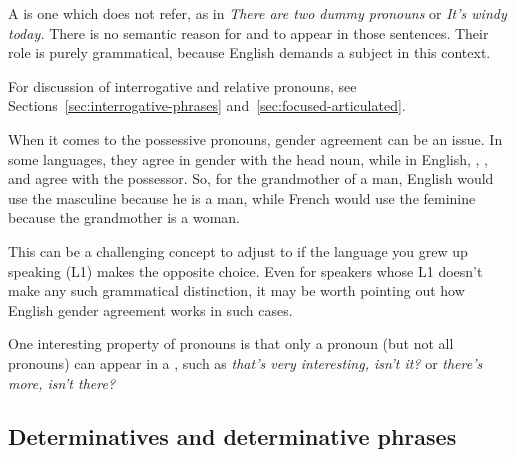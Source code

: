 A  is one which does not refer, as in \textit{\emph{There} are two dummy pronouns} or \textit{\emph{It}'s windy today.}\label{sec:dummy} There is no semantic reason for  and  to appear in those sentences. Their role is purely grammatical, because English demands a subject in this context.

For discussion of interrogative and relative pronouns, see Sections~\ref{sec:interrogative-phrases} and~\ref{sec:focused-articulated}.

When it comes to the possessive pronouns, gender agreement can be an issue. In some languages, they agree in gender with the head noun, while in English, , , and  agree with the possessor. So, for the grandmother of a man, English would use the masculine  because he is a man, while French would use the feminine  because the grandmother is a woman.

\ea \label{ex:his-grandmother}
    \z
\ex \label{ex:her-grandmother}
    \z
\z
This can be a challenging concept to adjust to if the language you grew up speaking (L1) makes the opposite choice. Even for speakers whose L1 doesn't make any such grammatical distinction, it may be worth pointing out how English gender agreement works in such cases.


One interesting property of pronouns is that only a pronoun (but not all pronouns) can appear in a , such as \textit{that's very interesting, \ob isn't \emph{it}\cb?} or \textit{there's more, \ob isn't \emph{there}\cb?}

\subsection{Determinatives and determinative phrases}
\label{sec:DPs}

